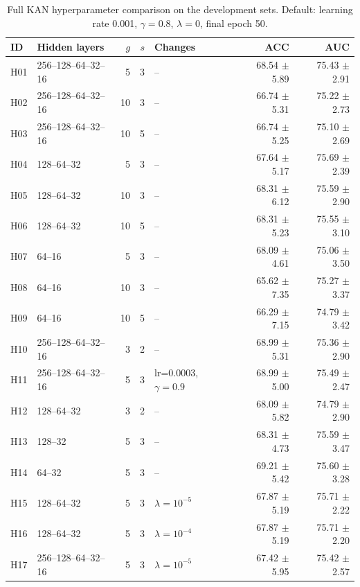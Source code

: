 \begin{table}[t]
\centering\fontsize{9}{11}\selectfont\setlength{\tabcolsep}{3pt}
\caption{Full KAN hyperparameter comparison on the development sets. Default: learning rate 0.001, $\gamma=0.8$, $\lambda=0$, final epoch 50.}
\begin{tabular}{llrrlrr}
\toprule
ID & Hidden layers & $g$ & $s$ & Changes & ACC & AUC \\
\midrule
H01 & 256--128--64--32--16 & 5 & 3 & -- & 68.54 $\pm$ 5.89 & 75.43 $\pm$ 2.91 \\
H02 & 256--128--64--32--16 & 10 & 3 & -- & 66.74 $\pm$ 5.31 & 75.22 $\pm$ 2.73 \\
H03 & 256--128--64--32--16 & 10 & 5 & -- & 66.74 $\pm$ 5.25 & 75.10 $\pm$ 2.69 \\
H04 & 128--64--32 & 5 & 3 & -- & 67.64 $\pm$ 5.17 & 75.69 $\pm$ 2.39 \\
H05 & 128--64--32 & 10 & 3 & -- & 68.31 $\pm$ 6.12 & 75.59 $\pm$ 2.90 \\
H06 & 128--64--32 & 10 & 5 & -- & 68.31 $\pm$ 5.23 & 75.55 $\pm$ 3.10 \\
H07 & 64--16 & 5 & 3 & -- & 68.09 $\pm$ 4.61 & 75.06 $\pm$ 3.50 \\
H08 & 64--16 & 10 & 3 & -- & 65.62 $\pm$ 7.35 & 75.27 $\pm$ 3.37 \\
H09 & 64--16 & 10 & 5 & -- & 66.29 $\pm$ 7.15 & 74.79 $\pm$ 3.42 \\
H10 & 256--128--64--32--16 & 3 & 2 & -- & 68.99 $\pm$ 5.31 & 75.36 $\pm$ 2.90 \\
H11 & 256--128--64--32--16 & 5 & 3 & lr=0.0003, $\gamma=0.9$ & 68.99 $\pm$ 5.00 & 75.49 $\pm$ 2.47 \\
H12 & 128--64--32 & 3 & 2 & -- & 68.09 $\pm$ 5.82 & 74.79 $\pm$ 2.90 \\
H13 & 128--32 & 5 & 3 & -- & 68.31 $\pm$ 4.73 & 75.59 $\pm$ 3.47 \\
H14 & 64--32 & 5 & 3 & -- & 69.21 $\pm$ 5.42 & 75.60 $\pm$ 3.28 \\
H15 & 128--64--32 & 5 & 3 & $\lambda=10^{-5}$ & 67.87 $\pm$ 5.19 & 75.71 $\pm$ 2.22 \\
H16 & 128--64--32 & 5 & 3 & $\lambda=10^{-4}$ & 67.87 $\pm$ 5.19 & 75.71 $\pm$ 2.20 \\
H17 & 256--128--64--32--16 & 5 & 3 & $\lambda=10^{-5}$ & 67.42 $\pm$ 5.95 & 75.42 $\pm$ 2.57 \\
\bottomrule
\end{tabular}
\end{table}
